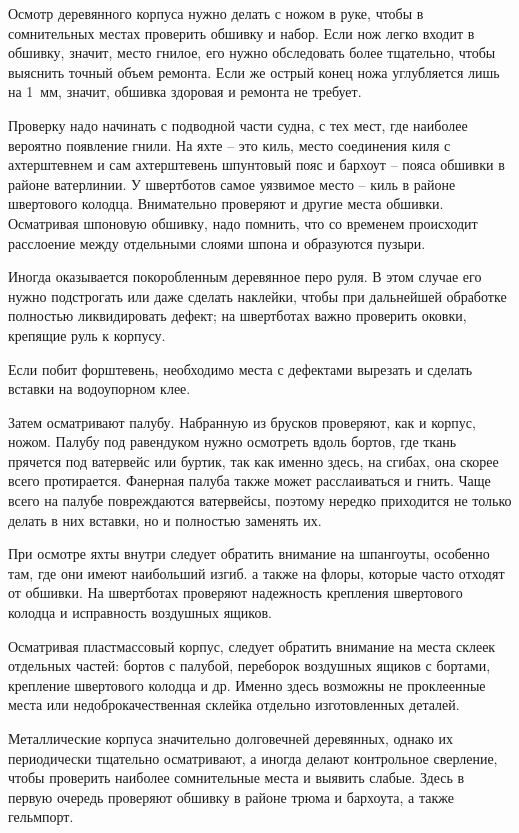 \documentclass[a4paper, 12pt, twoside, final]{scrbook}
\begin{document}
Осмотр деревянного корпуса нужно делать с ножом в руке, чтобы в сомнительных местах проверить обшивку и набор. Если нож легко входит в обшивку, значит, место гнилое, его нужно обследовать более тщательно, чтобы выяснить точный объем ремонта. Если же острый конец ножа углубляется лишь на 1~мм, значит, обшивка здоровая и ремонта не требует.

Проверку надо начинать с подводной части судна, с тех мест, где наиболее вероятно появление гнили. На яхте \--- это киль, место соединения киля с ахтерштевнем и сам ахтерштевень шпунтовый пояс и бархоут \--- пояса обшивки в районе ватерлинии. У швертботов самое уязвимое место \--- киль в районе швертового колодца. Внимательно проверяют и другие места обшивки. Осматривая шпоновую обшивку, надо помнить, что со временем происходит расслоение между отдельными слоями шпона и образуются пузыри.

Иногда оказывается покоробленным деревянное перо руля. В этом случае его нужно подстрогать или даже сделать наклейки, чтобы при дальнейшей обработке полностью ликвидировать дефект; на швертботах важно проверить оковки, крепящие руль к корпусу.

Если побит форштевень, необходимо места с дефектами вырезать и сделать вставки на водоупорном клее.

Затем осматривают палубу. Набранную из брусков проверяют, как и корпус, ножом. Палубу под равендуком нужно осмотреть вдоль бортов, где ткань прячется под ватервейс или буртик, так как именно здесь, на сгибах, она скорее всего протирается. Фанерная палуба также может расслаиваться и гнить. Чаще всего на палубе повреждаются ватервейсы, поэтому нередко приходится не только делать в них вставки, но и полностью заменять их.

При осмотре яхты внутри следует обратить внимание на шпангоуты, особенно там, где они имеют наибольший изгиб. а также на флоры, которые часто отходят от обшивки. На швертботах проверяют надежность крепления швертового колодца и исправность воздушных ящиков.

Осматривая пластмассовый корпус, следует обратить внимание на места склеек отдельных частей: бортов с палубой, переборок воздушных ящиков с бортами, крепление швертового колодца и др. Именно здесь возможны не проклеенные места или недоброкачественная склейка отдельно изготовленных деталей.

Металлические корпуса значительно долговечней деревянных, однако их периодически тщательно осматривают, а иногда делают контрольное сверление, чтобы проверить наиболее сомнительные места и выявить слабые. Здесь в первую очередь проверяют обшивку в районе трюма и бархоута, а также гельмпорт.
\end{document}
